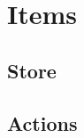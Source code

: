 \section{Items}
\label{sec:f-items}

\subsection{Store}
\label{ssec:fi-store}

\subsection{Actions}
\label{ssec:fi-actions}
